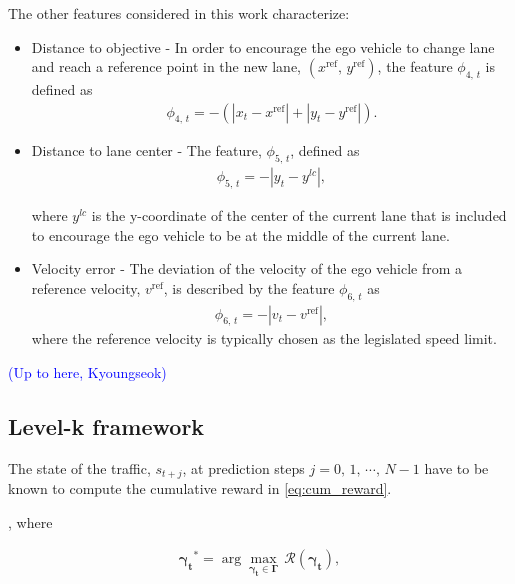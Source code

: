 \documentclass[10pt,journal]{IEEEtran}
\begin{document}
	The other features considered in this work characterize:
	\begin{itemize}
		\item Distance to objective - In order to encourage the ego vehicle to change lane and reach a reference point in the new lane, $\left(x^{\textrm{ref}},\,y^{\textrm{ref}}\right)$, the feature $\phi_{4,\,{t}} $ is defined as
		\begin{align}
		\phi_{4,\,{t}}  = -\left(\left|x_{t}-x^{\textrm{ref}}\right| + \left|y_{t}-y^{\textrm{ref}}\right|\right).
		\end{align}
		
		\item Distance to lane center - The feature, $\phi_{5,\,{t}} $, defined as 
		\begin{align}
		\phi_{5,\,{t}}  = - \left|y_{t}-y^{lc}\right|,
		\end{align}
		
		\noindent where $y^{lc}$ is the y-coordinate of the center of the current lane that is included to encourage the ego vehicle to be at the middle of the current lane.
		
		\item Velocity error - The deviation of the velocity of the ego vehicle from a reference velocity, $v^{\textrm{ref}}$, is described by the feature $\phi_{6,\,{t}}$ as
		\begin{align}
		\phi_{6,\,{t}} = - \left|v_{t}-v^{\textrm{ref}}\right|,
		\end{align}
		where the reference velocity is typically chosen as the legislated speed limit.
	\end{itemize}
	
	\textcolor{blue}{(Up to here, Kyoungseok)}
	\subsection{Level-k framework}
	\label{sec:level_k}
	
	
	
	
	The state of the traffic, $s_{t+j}$, at prediction steps $j=0,\,1,\,\cdots,\,N-1$ have to be known to compute the cumulative reward in \eqref{eq:cum_reward}.
	
	
	, where 
	
	\begin{align}
	\boldsymbol{\gamma_{t}}^* = \arg \underset {\boldsymbol{\gamma_{t}} \in  \boldsymbol{\Gamma}} {\max}\, \mathcal{R}\left(\boldsymbol{\gamma_{t}}\right),
	\end{align}
	
\end{document}
